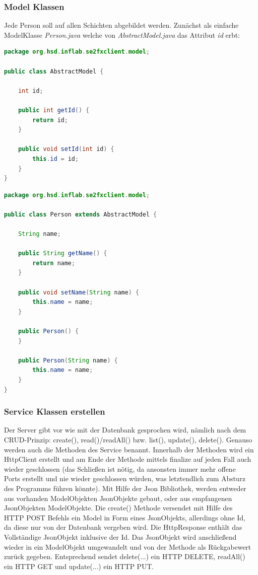 \documentclass[11pt]{scrartcl}
\begin{document}
\newpage
\subsubsection{Model Klassen}
\label{sec:modelclasses}
Jede Person soll auf allen Schichten abgebildet werden. Zunächst
als einfache ModelKlasse \textit{Person.java} welche von \textit{AbstractModel.java}
das Attribut \textit{id} erbt:
\begin{lstlisting}[language=java]
package org.hsd.inflab.se2fxclient.model;

public class AbstractModel {
    
    int id;

    public int getId() {
        return id;
    }

    public void setId(int id) {
        this.id = id;
    }
}    
\end{lstlisting}

\begin{lstlisting}[language=java]
package org.hsd.inflab.se2fxclient.model;

public class Person extends AbstractModel {

    String name;

    public String getName() {
        return name;
    }

    public void setName(String name) {
        this.name = name;
    }

    public Person() {
    }

    public Person(String name) {
        this.name = name;
    }    
}
\end{lstlisting}

\newpage
\subsubsection{Service Klassen erstellen}
\label{sec:serviceclasses}

Der Server gibt vor wie mit der Datenbank gesprochen wird, nämlich
nach dem CRUD-Prinzip: create(), read()/readAll() bzw. list(), update(), 
delete(). Genauso werden auch 
die Methoden des Service benannt. Innerhalb der Methoden wird
ein HttpClient erstellt und am Ende der Methode mittels finalize 
auf jeden Fall auch wieder geschlossen (das Schließen ist nötig, da ansonsten
immer mehr offene Ports erstellt und nie wieder geschlossen würden,
was letztendlich zum Absturz des Programms führen könnte).
Mit Hilfe der Json Bibliothek, werden entweder aus vorhanden ModelObjekten 
JsonObjekte gebaut, oder aus empfangenen JsonObjekten
ModelObjekte. Die create() Methode versendet mit Hilfe des HTTP POST 
Befehls ein Model in Form eines JsonObjekts, allerdings ohne Id, da diese
nur von der Datenbank vergeben wird. Die HttpResponse 
enthält das Vollständige JsonObjekt inklusive der Id.
Das JsonObjekt wird anschließend wieder in ein ModelObjekt 
umgewandelt und von der Methode als Rückgabewert zurück gegeben.
Entsprechend sendet delete(...) ein HTTP DELETE, readAll() ein HTTP GET und
update(...) ein HTTP PUT.
\end{document}
